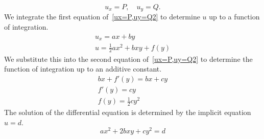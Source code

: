 {\begin{Solution}
\begin{enumerate}
\begin{equation}
        \label{ux=P,uy=Q2}
        u_x = P, \quad u_y = Q.
      \end{equation}
      We integrate the first equation of~\ref{ux=P,uy=Q2} to determine $u$ up 
      to a function of integration.
      \begin{gather*}
        u_x = a x + b y \\
        u = \frac{1}{2} a x^2 + b x y + f(y)
      \end{gather*}
      We substitute this into the second equation of~\ref{ux=P,uy=Q2} to determine
      the function of integration up to an additive constant.
      \begin{gather*}
        b x + f'(y) = b x + c y \\
        f'(y) = c y \\
        f(y) = \frac{1}{2} c y^2
      \end{gather*}
      The solution of the differential equation is determined by the 
      implicit equation $u = d$.
      \[
      \boxed{
        a x^2 + 2 b x y + c y^2 = d
        }
      \]
    \end{enumerate}
  \end{Solution}










}
